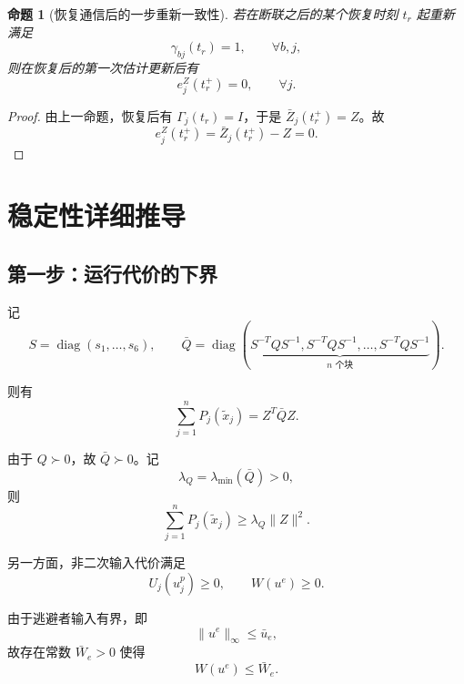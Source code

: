 \documentclass[12pt,a4paper]{ctexart}
\newtheorem{proposition}{命题}
\begin{document}
\begin{proposition}[恢复通信后的一步重新一致性]
若在断联之后的某个恢复时刻 $t_r$ 起重新满足
\begin{equation}
\gamma_{bj}(t_r)=1,\qquad \forall b,j,
\end{equation}
则在恢复后的第一次估计更新后有
\begin{equation}
e_j^Z(t_r^+)=0,\qquad \forall j.
\end{equation}
\end{proposition}

\begin{proof}
由上一命题，恢复后有 $\Gamma_j(t_r)=I$，于是 $\bar Z_j(t_r^+)=Z$。故
\begin{equation}
e_j^Z(t_r^+)=\bar Z_j(t_r^+)-Z=0.
\end{equation}
\end{proof}

\section{稳定性详细推导}

\subsection{第一步：运行代价的下界}

记
\begin{equation}
S=\operatorname{diag}(s_1,\dots,s_6),
\qquad
\bar Q=\operatorname{diag}(\underbrace{S^{-T}QS^{-1},S^{-T}QS^{-1},\dots,S^{-T}QS^{-1}}_{n\text{ 个块}}).
\end{equation}

则有
\begin{equation}
\sum_{j=1}^{n}P_j(\tilde x_j)=Z^T\bar Q Z.
\end{equation}

由于 $Q\succ 0$，故 $\bar Q\succ 0$。记
\begin{equation}
\lambda_Q=\lambda_{\min}(\bar Q)>0,
\end{equation}
则
\begin{equation}
\sum_{j=1}^{n}P_j(\tilde x_j)\ge \lambda_Q\|Z\|^2.
\end{equation}

另一方面，非二次输入代价满足
\begin{equation}
U_j(u_j^p)\ge 0,\qquad W(u^e)\ge 0.
\end{equation}

由于逃避者输入有界，即
\begin{equation}
\|u^e\|_{\infty}\le \bar u_e,
\end{equation}
故存在常数 $\bar W_e>0$ 使得
\begin{equation}
W(u^e)\le \bar W_e.
\end{equation}
\end{document}
